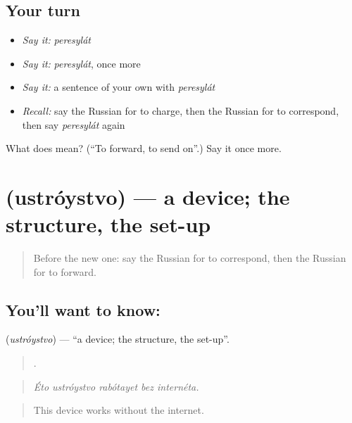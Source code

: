 \subsection*{Your turn}
\begin{itemize}
\raggedright
  \item \emph{Say it:} \emph{peresylát}
  \item \emph{Say it:} \emph{peresylát}, once more
  \item \emph{Say it:} a sentence of your own with \emph{peresylát}
  \item \emph{Recall:} say the Russian for to charge, then the Russian for to correspond, then say \emph{peresylát} again
\end{itemize}

\begin{tcolorbox}[breakable,colback=teal!4,colframe=teal!35!black,title={Before you move on}]
What does  mean? (\textquotedblleft{}To forward, to send on\textquotedblright{}.) Say it once more.
\end{tcolorbox}
\section[\texorpdfstring{\ru{устройство} (ustróystvo)}{устройство (ustróystvo)}]{ (ustróystvo) — a device; the structure, the set-up}

\label{lesson:RU-C402-ustroystvo}



\begin{quote}
Before the new one: say the Russian for to correspond, then the Russian for to forward.
\end{quote}

\subsection*{You'll want to know: }
\textbf{} (\emph{ustróystvo}) — \textquotedblleft{}a device; the structure, the set-up\textquotedblright{}.

\begin{quote}
    .
\end{quote}

\begin{quote}
\emph{Éto ustróystvo rabótayet bez internéta.}
\end{quote}

\begin{quote}
This device works without the internet.
\end{quote}

